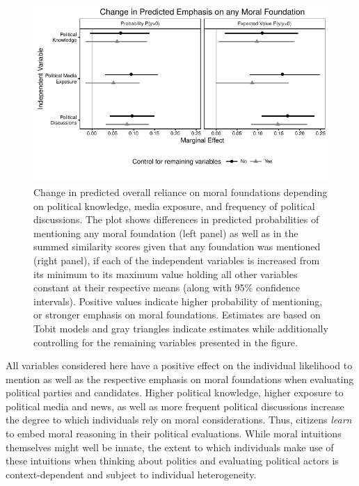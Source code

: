 \documentclass[12pt]{article}
\begin{document}
\begin{figure}[h]\centering
\includegraphics{../calc/fig/tobit_learn.pdf}
\caption{Change in predicted overall reliance on moral foundations depending on political knowledge, media exposure, and frequency of political discussions. The plot shows differences in predicted probabilities of mentioning any moral foundation (left panel) as well as in the summed similarity scores given that any foundation was mentioned (right panel), if each of the independent variables is increased from its minimum to its maximum value holding all other variables constant at their respective means (along with 95\% confidence intervals). Positive values indicate higher probability of mentioning, or stronger emphasis on moral foundations. Estimates are based on Tobit models and gray triangles indicate estimates while additionally controlling for the remaining variables presented in the figure. %
}\label{fig:tobit_learn}
\end{figure}

All variables considered here have a positive effect on the individual likelihood to mention as well as the respective emphasis on moral foundations when evaluating political parties and candidates. Higher political knowledge, higher exposure to political media and news, as well as more frequent political discussions increase the degree to which individuals rely on moral considerations. Thus, citizens \textit{learn} to embed moral reasoning in their political evaluations. While moral intuitions themselves might well be innate, the extent to which individuals make use of these intuitions when thinking about politics and evaluating political actors is context-dependent and subject to individual heterogeneity.
\end{document}
